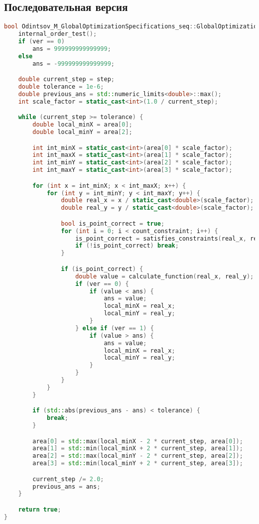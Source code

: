\documentclass[a4paper,12pt]{article}
\begin{document}
\subsection*{Последовательная версия}
\begin{lstlisting}[language=C++, caption=Код последовательной версии]
bool Odintsov_M_GlobalOptimizationSpecifications_seq::GlobalOptimizationSpecificationsSequential::run() {
    internal_order_test();
    if (ver == 0)
        ans = 999999999999999;
    else
        ans = -999999999999999;

    double current_step = step;
    double tolerance = 1e-6;
    double previous_ans = std::numeric_limits<double>::max();
    int scale_factor = static_cast<int>(1.0 / current_step);

    while (current_step >= tolerance) {
        double local_minX = area[0];
        double local_minY = area[2];

        int int_minX = static_cast<int>(area[0] * scale_factor);
        int int_maxX = static_cast<int>(area[1] * scale_factor);
        int int_minY = static_cast<int>(area[2] * scale_factor);
        int int_maxY = static_cast<int>(area[3] * scale_factor);

        for (int x = int_minX; x < int_maxX; x++) {
            for (int y = int_minY; y < int_maxY; y++) {
                double real_x = x / static_cast<double>(scale_factor);
                double real_y = y / static_cast<double>(scale_factor);

                bool is_point_correct = true;
                for (int i = 0; i < count_constraint; i++) {
                    is_point_correct = satisfies_constraints(real_x, real_y, i);
                    if (!is_point_correct) break;
                }

                if (is_point_correct) {
                    double value = calculate_function(real_x, real_y);
                    if (ver == 0) {
                        if (value < ans) {
                            ans = value;
                            local_minX = real_x;
                            local_minY = real_y;
                        }
                    } else if (ver == 1) {
                        if (value > ans) {
                            ans = value;
                            local_minX = real_x;
                            local_minY = real_y;
                        }
                    }
                }
            }
        }

        if (std::abs(previous_ans - ans) < tolerance) {
            break;
        }

        area[0] = std::max(local_minX - 2 * current_step, area[0]);
        area[1] = std::min(local_minX + 2 * current_step, area[1]);
        area[2] = std::max(local_minY - 2 * current_step, area[2]);
        area[3] = std::min(local_minY + 2 * current_step, area[3]);

        current_step /= 2.0;
        previous_ans = ans;
    }

    return true;
}
\end{lstlisting}
\end{document}
